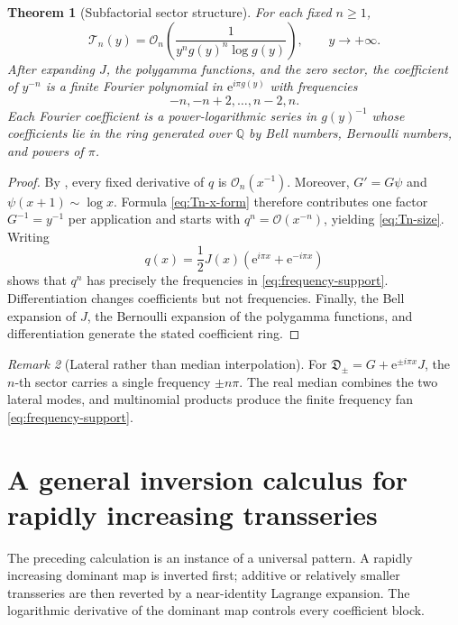 \documentclass[11pt,oneside]{article}
\theoremstyle{plain}
\newtheorem{theorem}{Theorem}[section]
\theoremstyle{definition}
\theoremstyle{remark}
\newtheorem{remark}[theorem]{Remark}
\newcommand{\ee}{\mathrm{e}}
\newcommand{\Dfrak}{\mathfrak{D}}
\newcommand{\Tcal}{\mathcal{T}}
\newcommand{\bigO}{\mathcal{O}}
\begin{document}
\begin{theorem}[Subfactorial sector structure]
\label{thm:sector-structure}
For each fixed \(n\ge1\),
\begin{equation}
 \Tcal_n(y)=\bigO_n\!\left(
 \frac{1}{y^n g(y)^n\log g(y)}
 \right),
 \qquad y\to+\infty.
 \label{eq:Tn-size}
\end{equation}
After expanding \(J\), the polygamma functions, and the zero sector, the
coefficient of \(y^{-n}\) is a finite Fourier polynomial in
\(\ee^{i\pi g(y)}\) with frequencies
\begin{equation}
 -n,-n+2,\ldots,n-2,n.
 \label{eq:frequency-support}
\end{equation}
Each Fourier coefficient is a power-logarithmic series in \(g(y)^{-1}\) whose
coefficients lie in the ring generated over \(\mathbb{Q}\) by Bell numbers,
Bernoulli numbers, and powers of \(\pi\).
\end{theorem}
\begin{proof}
By , every fixed derivative of \(q\) is
\(\bigO_n(x^{-1})\).  Moreover,
\(G'=G\psi\) and \(\psi(x+1)\sim\log x\).  Formula
\eqref{eq:Tn-x-form} therefore contributes one factor \(G^{-1}=y^{-1}\) per
application and starts with \(q^n=\bigO(x^{-n})\), yielding
\eqref{eq:Tn-size}.  Writing
\[
 q(x)=\frac12J(x)\left(\ee^{i\pi x}+\ee^{-i\pi x}\right)
\]
shows that \(q^n\) has precisely the frequencies in
\eqref{eq:frequency-support}.  Differentiation changes coefficients but not
frequencies.  Finally, the Bell expansion of \(J\), the Bernoulli expansion of
the polygamma functions, and differentiation generate the stated coefficient
ring.
\end{proof}

\begin{remark}[Lateral rather than median interpolation]
For \(\Dfrak_\pm=G+\ee^{\pm i\pi x}J\), the \(n\)-th sector carries a single
frequency \(\pm n\pi\).  The real median combines the two lateral modes, and
multinomial products produce the finite frequency fan
\eqref{eq:frequency-support}.
\end{remark}

\section{A general inversion calculus for rapidly increasing transseries}
\label{sec:general-theory}

The preceding calculation is an instance of a universal pattern.  A rapidly
increasing dominant map is inverted first; additive or relatively smaller
transseries are then reverted by a near-identity Lagrange expansion.  The
logarithmic derivative of the dominant map controls every coefficient block.
\end{document}
